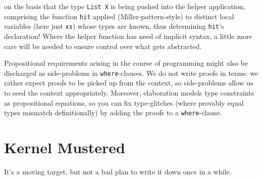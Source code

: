 \documentclass{article}
\begin{document}
on the basis that the type \texttt{List X} is being pushed into
the helper application, comprising the function \texttt{hit} applied
(Miller-pattern-style) to distinct local variables (here just \texttt{xs})
whose types are known, thus determining \texttt{hit}'s declaration!
Where the helper function has need of implicit syntax, a little more
care will be needed to ensure control over what gets abstracted.

Propositional requirements arising in the course of programming might
also be discharged as side-problems in \texttt{where}-clauses. We do not
write proofs in terms: we rather expect proofs to be picked up from the
context, so side-problems allow us to seed the context appropriately.
Moreover, elaboration models type constraints as propositional equations,
so you can fix type-glitches (where provably equal types mismatch
definitionally) by adding the proofs to a \texttt{where}-clause.


\section{Kernel Mustered}

\newcommand{\SC}{\textsc}
\newcommand{\Set}[1]{\mathrm{Set}^{#1}}
\newcommand{\PI}[2]{(#1\!:\!#2)\to}
\newcommand{\SG}[2]{(#1\!:\!#2)\times}
\newcommand{\ONE}{\mathrm{1}}
\newcommand{\ifr}{\underline}
\newcommand{\lam}[1]{\lambda#1\mapsto}
\newcommand{\pr}[2]{[#1 | #2]}
\newcommand{\vd}{[]}
\newcommand{\cum}{\preceq}
\newcommand{\car}[1]{#1\:!}
\newcommand{\cdr}[1]{#1\:-}
\newcommand{\nm}{\Downarrow}
\newcommand{\SJ}[4]{#1\:\{#2 \mapsto #3\}\nm#4}
\newcommand{\letin}[3]{\mathrm{let}\: #1 = #2 \:\mathrm{in}\: #3}

It's a moving target, but not a bad plan to write it down once in a
while.
\end{document}
